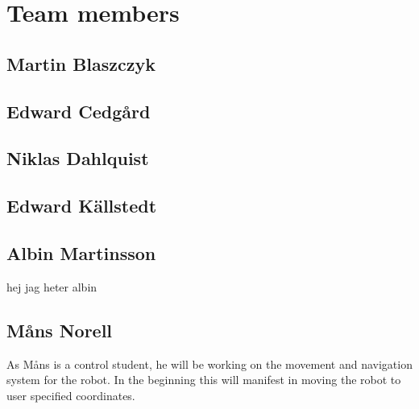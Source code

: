 \section{Team members}

\subsection{Martin Blaszczyk}

\subsection{Edward Cedgård}

\subsection{Niklas Dahlquist}

\subsection{Edward Källstedt}

\subsection{Albin Martinsson} hej jag heter albin

\subsection{Måns Norell}
As Måns is a control student, he will be working on the movement and navigation system for the robot. In the beginning this will manifest in moving the robot to user specified coordinates.









